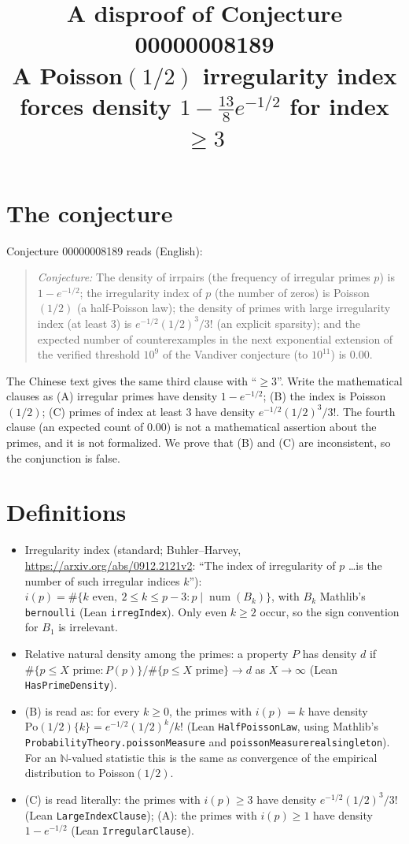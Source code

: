 \documentclass[11pt]{article}
\title{A disproof of Conjecture 00000008189\\[2pt]
\large A Poisson$(1/2)$ irregularity index forces density $1-\tfrac{13}{8}e^{-1/2}$ for index $\ge 3$}
\date{}
\renewcommand{\_}{\oldus\allowbreak}
\theoremstyle{definition}
\theoremstyle{remark}
\begin{document}
\sloppy
\maketitle

\section{The conjecture}

Conjecture 00000008189 reads (English):
\begin{quote}
\emph{Conjecture:} The density of irr\_pairs (the frequency of irregular primes $p$) is $1 - e^{-1/2}$;
the irregularity index of $p$ (the number of zeros) is Poisson$(1/2)$ (a half-Poisson law); the density of
primes with large irregularity index (at least 3) is $e^{-1/2} (1/2)^3/3!$ (an explicit sparsity); and the
expected number of counterexamples in the next exponential extension of the verified threshold $10^9$ of the
Vandiver conjecture (to $10^{11}$) is $0.00$.
\end{quote}
The Chinese text gives the same third clause with ``$\ge 3$''. Write the mathematical clauses as
(A) irregular primes have density $1-e^{-1/2}$; (B) the index is Poisson$(1/2)$; (C) primes of index at
least $3$ have density $e^{-1/2}(1/2)^3/3!$. The fourth clause (an expected count of $0.00$) is not a
mathematical assertion about the primes, and it is not formalized. We prove that (B) and (C) are
inconsistent, so the conjunction is false.

\section{Definitions}

\begin{itemize}[nosep]
\item Irregularity index (standard; Buhler--Harvey, \url{https://arxiv.org/abs/0912.2121v2}: ``The index of
  irregularity of $p$ \dots is the number of such irregular indices $k$''): $i(p) = \#\{k \text{ even},\ 2 \le
  k \le p-3 : p \mid \operatorname{num}(B_k)\}$, with $B_k$ Mathlib's \texttt{bernoulli} (Lean
  \texttt{irregIndex}). Only even $k \ge 2$ occur, so the sign convention for $B_1$ is irrelevant.
\item Relative natural density among the primes: a property $P$ has density $d$ if
  $\#\{p \le X \text{ prime} : P(p)\}/\#\{p \le X \text{ prime}\} \to d$ as $X \to \infty$ (Lean
  \texttt{HasPrimeDensity}).
\item (B) is read as: for every $k \ge 0$, the primes with $i(p) = k$ have density
  $\mathrm{Po}(1/2)\{k\} = e^{-1/2}(1/2)^k/k!$ (Lean \texttt{HalfPoissonLaw}, using Mathlib's
  \texttt{ProbabilityTheory.poissonMeasure} and \texttt{poissonMeasure\_real\_singleton}). For an
  $\mathbb{N}$-valued statistic this is the same as convergence of the empirical distribution to
  Poisson$(1/2)$.
\item (C) is read literally: the primes with $i(p) \ge 3$ have density $e^{-1/2}(1/2)^3/3!$ (Lean
  \texttt{LargeIndexClause}); (A): the primes with $i(p) \ge 1$ have density $1 - e^{-1/2}$ (Lean
  \texttt{IrregularClause}).
\end{itemize}
\end{document}
